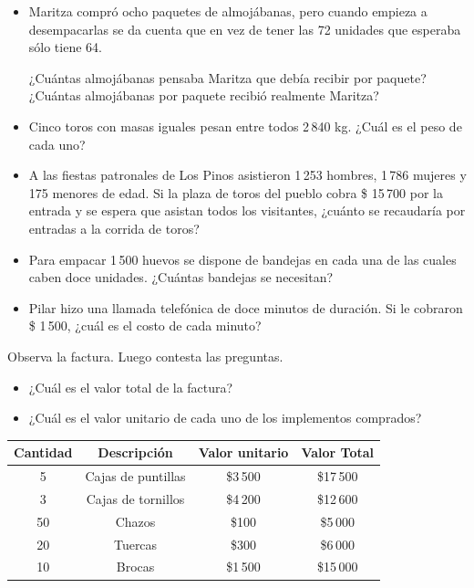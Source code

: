 \documentclass[letterpaper,11pt,twoside]{article}
\begin{document}
\begin{itemize}
\item Maritza compró ocho paquetes de almojábanas, pero
cuando empieza a desempacarlas se da cuenta que en vez
de tener las 72 unidades que esperaba sólo tiene 64.

¿Cuántas almojábanas pensaba Maritza que debía recibir
por paquete? ¿Cuántas almojábanas por paquete recibió
realmente Maritza?
\item Cinco toros con masas iguales pesan entre todos 2\,840
kg. ¿Cuál es el peso de cada uno?
\item A las fiestas patronales de Los Pinos asistieron 1\,253 hombres, 1\,786 mujeres y 175 menores de edad. Si la
plaza de toros del pueblo cobra \$ 15\,700 por la entrada
y se espera que asistan todos los visitantes, ¿cuánto se
recaudaría por entradas a la corrida de toros?
\item Para empacar 1\,500 huevos se dispone de bandejas en
cada una de las cuales caben doce unidades. ¿Cuántas
bandejas se necesitan?
\item Pilar hizo una llamada telefónica de doce minutos de
duración. Si le cobraron \$ 1\,500, ¿cuál es el costo de
cada minuto?
 \end{itemize}
\begin{minipage}{.35\textwidth}
 Observa la factura. Luego contesta las preguntas.
 \begin{itemize}
 \item ¿Cuál es el valor total de la factura?
\item ¿Cuál es el valor unitario de cada uno de los implementos comprados?
\end{itemize}
\end{minipage}\hfill
\begin{minipage}{.65\textwidth}
\begin{center}
\begin{tabular}{|c|c|c|c|}
\hline 
\textbf{Cantidad} & \textbf{Descripción} & \textbf{Valor unitario} & \textbf{Valor Total} \\ 
\hline 
5 & Cajas de puntillas & \$3\,500 & \$17\,500 \\ 
\hline 
3 & Cajas de tornillos & \$4\,200 & \$12\,600 \\ 
\hline 
50 & Chazos & \$100 & \$5\,000 \\ 
\hline 
20 & Tuercas & \$300 & \$6\,000 \\ 
\hline 
10 & Brocas & \$1\,500 & \$15\,000 \\ 
\hline 
\end{tabular} 
\end{center}
\end{minipage}
\end{document}

